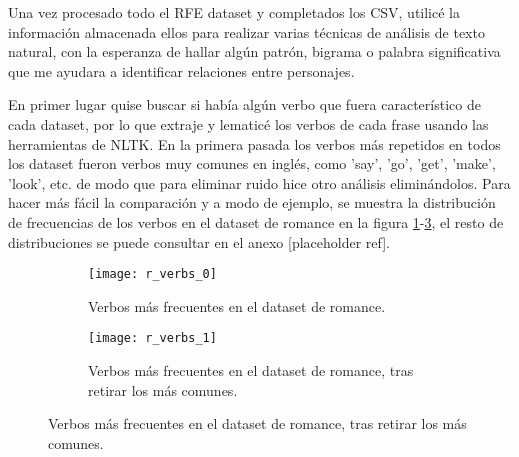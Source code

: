 \documentclass{pre-tfg}
\newcommand{\refToAnexoDatosRFE}{[placeholder ref]}
\begin{document}
\begin{table}[]
	\caption{Estructura de \textit{fic\_characters.csv}}
	\label{table:fic_characters}
\end{table}

Una vez procesado todo el RFE dataset y completados los CSV, utilicé la información almacenada ellos para realizar varias técnicas de análisis de texto natural, con la esperanza de hallar algún patrón, bigrama o palabra significativa que me ayudara a identificar relaciones entre personajes.

En primer lugar quise buscar si había algún verbo que fuera característico de cada dataset, por lo que extraje y lematicé los verbos de cada frase usando las herramientas de NLTK. En la primera pasada los verbos más repetidos en todos los dataset fueron verbos muy comunes en inglés, como 'say', 'go', 'get', 'make', 'look', etc. de modo que para eliminar ruido hice otro análisis eliminándolos. Para hacer más fácil la comparación y a modo de ejemplo, se muestra la distribución de frecuencias de los verbos en el dataset de romance en la figura \ref{fig:r_verbs}-\ref{fig:r_verbs_removed}, el resto de distribuciones se puede consultar en el anexo \refToAnexoDatosRFE.


\begin{figure}[h!]
	\centering
	\begin{subfigure}{\textwidth}
		\texttt{[image: r\_verbs\_0]}
		\caption{Verbos más frecuentes en el dataset de romance.}
		\label{fig:r_verbs}
		
	\end{subfigure}
	\begin{subfigure}{\textwidth}
		\texttt{[image: r\_verbs\_1]}
		\caption{Verbos más frecuentes en el dataset de romance, tras retirar los más comunes.}
		\label{fig:r_verbs_removed}
	\end{subfigure}
	
	
\end{figure}
\end{document}
